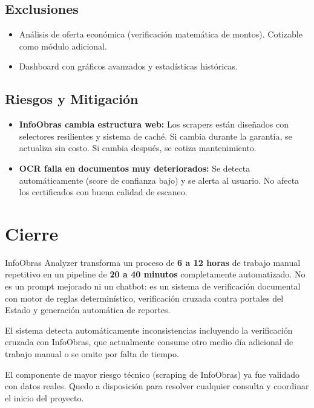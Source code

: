 \documentclass[11pt,a4paper]{article}
\begin{document}
\subsection{Exclusiones}
\begin{itemize}[leftmargin=*]
    \item Análisis de oferta económica (verificación matemática de montos). Cotizable como módulo adicional.
    \item Dashboard con gráficos avanzados y estadísticas históricas.
\end{itemize}

\subsection{Riesgos y Mitigación}
\begin{itemize}[leftmargin=*]
    \item \textbf{InfoObras cambia estructura web:} Los scrapers están diseñados con selectores resilientes y sistema de caché. Si cambia durante la garantía, se actualiza sin costo. Si cambia después, se cotiza mantenimiento.
    \item \textbf{OCR falla en documentos muy deteriorados:} Se detecta automáticamente (score de confianza bajo) y se alerta al usuario. No afecta los certificados con buena calidad de escaneo.
\end{itemize}

\section*{Cierre}

InfoObras Analyzer transforma un proceso de \textbf{6 a 12 horas} de trabajo manual repetitivo en un pipeline de \textbf{20 a 40 minutos} completamente automatizado. No es un prompt mejorado ni un chatbot: es un sistema de verificación documental con motor de reglas determinístico, verificación cruzada contra portales del Estado y generación automática de reportes.

El sistema detecta automáticamente inconsistencias incluyendo la verificación cruzada con InfoObras, que actualmente consume otro medio día adicional de trabajo manual o se omite por falta de tiempo.

El componente de mayor riesgo técnico (scraping de InfoObras) ya fue validado con datos reales.
Quedo a disposición para resolver cualquier consulta y coordinar el inicio del proyecto.
\end{document}
